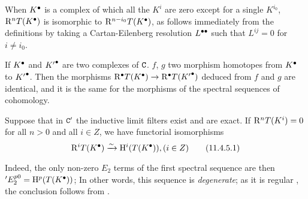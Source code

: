 \begin{env}[11.4.3]
When ${K}^{\bullet}$ is a complex of which all the $K^i$ are zero except for a single $K^{i_0}$,
$\mathrm{R}^n T({K}^{\bullet})$ is isomorphic to $\mathrm{R}^{n-i_0} T({K}^{\bullet})$, as follows immediately from the definitions by taking a Cartan-Eilenberg resolution ${L}^{\bullet\bullet}$ such that $L^{ij}=0$ for $i\neq i_0$.

If ${K}^{\bullet}$ and ${K'}^{\bullet}$ are two complexes of $\mathtt{C}$. $f$, $g$ two morphism homotopes from ${K}^{\bullet}$ to ${K'}^{\bullet}$.
Then the morphisms ${\mathrm{R}}^{\bullet}T({K}^{\bullet}) \rightarrow {\mathrm{R}}^{\bullet}T({K'}^{\bullet})$ deduced from $f$ and $g$ are identical,
and it is the same for the morphisms of the spectral sequences of cohomology.
\end{env}


\begin{proposition}[11.4.5]
\label{0.11.4.5}
Suppose that in $\mathtt{C}'$ the inductive limit filters exist and are exact.
If $\mathrm{R}^n T(K^i) = 0$ for all $n>0$ and all $i\in Z$, we have functorial isomorphisms
\[
\label{0.11.4.5.1}
  \mathrm{R}^i T({K}^{\bullet}) \xrightarrow{\sim} \mathrm{H}^i(T({K}^{\bullet})), (i\in Z)
\tag{11.4.5.1}
\]
\end{proposition}
Indeed, the only non-zero $E_2$ terms of the first spectral sequence  are then $'E_2^{p0} = \mathrm{H}^p(T({K}^{\bullet}))$;
In other words, this sequence is \emph{degenerate}; as it is regular , the conclusion follows from .


